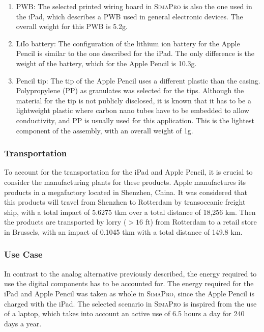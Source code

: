 \begin{enumerate}
\begin{enumerate}
        \item PWB: The selected printed wiring board in \textsc{SimaPro} is also the one used in the iPad, which describes a PWB used in general electronic devices. The overall weight for this PWB is 5.2g. 
        \item LiIo battery: The configuration of the lithium ion battery for the Apple Pencil is similar to the one described for the iPad. The only difference is the weight of the battery, which for the Apple Pencil is 10.3g. 
        \item Pencil tip: The tip of the Apple Pencil uses a different plastic than the casing. Polypropylene (PP) as granulates was selected for the tips. Although the material for the tip is not publicly disclosed, it is known that it has to be a lightweight plastic where carbon nano tubes have to be embedded to allow conductivity, and PP is usually used for this application. This is the lightest component of the assembly, with an overall weight of 1g.  
    \end{enumerate}
\end{enumerate}

\subsubsection{Transportation}
To account for the transportation for the iPad and Apple Pencil, it is crucial to consider the manufacturing plants for these products. Apple manufactures its products in a megafactory located in Shenzhen, China. It was considered that this products will travel from Shenzhen to Rotterdam by transoceanic freight ship, with a total impact of 5.6275 tkm over a total distance of 18,256 km. Then the products are transported by lorry ($> 16$ ft) from Rotterdam to a retail store in Brussels, with an impact of 0.1045 tkm with a total distance of 149.8 km. 

\subsubsection*{Use Case}
In contrast to the analog alternative previously described, the energy required to use the digital components has to be accounted for. The energy required for the iPad and Apple Pencil was taken as whole in \textsc{SimaPro}, since the Apple Pencil is charged with the iPad. The selected scenario in \textsc{SimaPro} is inspired from the use of a laptop, which takes into account an active use of 6.5 hours a day for 240 days a year. 


